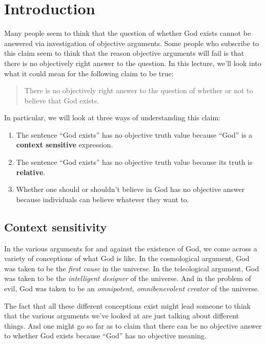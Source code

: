 \documentclass[letterpaper,10pt]{article}
\begin{document}
\section{Introduction}

Many people seem to think that the question of whether God exists cannot be answered via investigation of objective arguments.  Some people who subscribe to this claim seem to think that the reason objective arguments will fail is that there is no objectively right answer to the question.  In this lecture, we'll look into what it could mean for the following claim to be true:

\begin{quote}
 There is no objectively right answer to the question of whether or not to believe that God exists.
\end{quote}

In particular, we will look at three ways of understanding this claim:
\begin{enumerate}
 \item The sentence ``God exists'' has no objective truth value because ``God'' is a \textbf{context sensitive} expression.
 \item The sentence ``God exists'' has no objective truth value because its truth is \textbf{relative}.
 \item Whether one should or shouldn't believe in God has no objective answer because individuals can believe whatever they want to.
\end{enumerate}

\subsection{Context sensitivity}
In the various arguments for and against the existence of God, we come across a variety of conceptions of what God is like.  In the cosmological argument, God was taken to be the \textit{first cause} in the universe. In the teleological argument, God was taken to be the \textit{intelligent designer} of the universe. And in the problem of evil, God was taken to be an \textit{omnipotent, omnibenevolent creator} of the universe.

The fact that all these different conceptions exist might lead someone to think that the various arguments we've looked at are just talking about different things.  And one might go so far as to claim that there can be no objective answer to whether God exists because ``God'' has no objective meaning.
\end{document}
